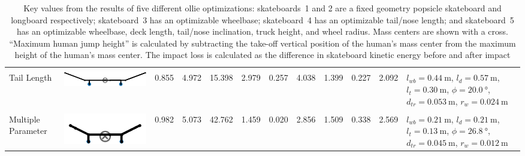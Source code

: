 \documentclass[default,iicol]{sn-jnl}
\begin{document}
\begin{table}
\begin{center}
{\begin{tabular}{p{1.6cm} c p{1.2cm} p{1.2cm} p{1.2cm} p{1.2cm} p{1.2cm} p{1.2cm} p{1.2cm} p{1.2cm} p{1.2cm} m{4.3cm}}
    & & & & & & & & & & & \\

    Tail Length & \includegraphics[]{paper/figure/Table1d.png}   
    & 0.855        & 4.972     & 15.398     & 2.979    & 0.257   & 4.038   & 1.399     & 0.227     & 2.092     
    & $l_{wb}=\SI{0.44}{\meter}$, $l_d=\SI{0.57}{\meter}$, \newline $l_t=\SI{0.30}{\meter}$, $\phi=\SI{20.0}{\degree}$, \newline $d_{tr}=\SI{0.053}{\meter}$, $r_w=\SI{0.024}{\meter}$ \\

    & & & & & & & & & & & \\

    Multiple Parameter & \includegraphics[]{paper/figure/Table1e.png}   
    & 0.982        & 5.073     & 42.762     & 1.459    & 0.020   & 2.856   & 1.509     & 0.338     & 2.569
    & $l_{wb}=\SI{0.21}{\meter}$, $l_d=\SI{0.21}{\meter}$, \newline $l_t=\SI{0.13}{\meter}$, $\phi=\SI{26.8}{\degree}$, \newline $d_{tr}=\SI{0.045}{\meter}$, $r_w=\SI{0.012}{\meter}$ \\
    
    \bottomrule
  \end{tabular}}
  \end{center}
    \caption[Results benchmarks]{Key values from the results of five different ollie optimizations: skateboards~1 and 2 are a fixed geometry popsicle skateboard and longboard respectively; skateboard~3 has an optimizable wheelbase; skateboard~4 has an optimizable tail/nose length; and skateboard~5 has an optimizable wheelbase, deck length, tail/nose inclination, truck height, and wheel radius. Mass centers are shown with a cross. ``Maximum human jump height'' is calculated by subtracting the take-off vertical position of the human's mass center from the maximum height of the human's mass center. The impact loss is calculated as the difference in skateboard kinetic energy before and after impact}
    \label{fig:resultstable}
\end{table}
\end{document}
